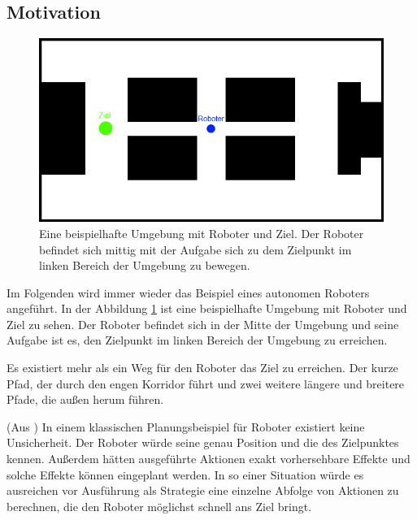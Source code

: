 \documentclass[a4paper]{IEEEtran}
\begin{document}
\subsection{Motivation}
\begin{figure}[ht]
	\centering
	\includegraphics[scale=0.42]{images/autnmRobot_basicSituation.png}
	\caption{Eine beispielhafte Umgebung mit Roboter und Ziel. Der Roboter befindet sich mittig mit der Aufgabe sich zu dem Zielpunkt im linken Bereich der Umgebung zu bewegen.}
	\label{fig:holoch_autnmRob_bSit}
\end{figure}
Im Folgenden wird immer wieder das Beispiel eines autonomen Roboters angeführt. In der Abbildung \ref{fig:holoch_autnmRob_bSit} ist eine beispielhafte Umgebung mit Roboter und Ziel zu sehen. Der Roboter befindet sich in der Mitte der Umgebung und seine Aufgabe ist es, den Zielpunkt im linken Bereich der Umgebung zu erreichen. 

Es existiert mehr als ein Weg für den Roboter das Ziel zu erreichen. Der kurze Pfad, der durch den engen Korridor führt und zwei weitere längere und breitere Pfade, die außen herum führen.

(Aus \cite{PR_ThrunBurgardFox}) In einem klassischen Planungsbeispiel für Roboter existiert keine Unsicherheit. Der Roboter würde seine genau Position und die des Zielpunktes kennen. Außerdem hätten ausgeführte Aktionen exakt vorhersehbare Effekte und solche Effekte können eingeplant werden. In so einer Situation würde es ausreichen vor Ausführung als Strategie eine einzelne Abfolge von Aktionen zu berechnen, die den Roboter möglichst schnell ans Ziel bringt.
\end{document}
